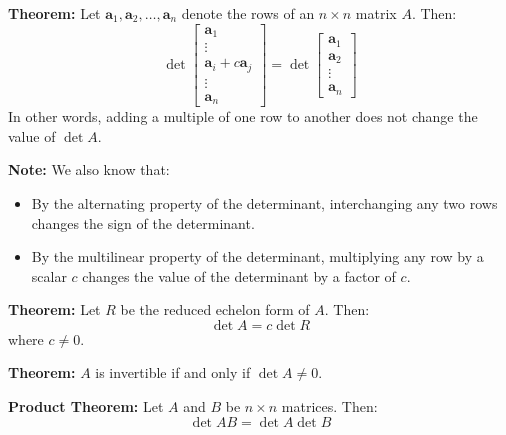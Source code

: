 \documentclass{article}
\newcommand{\bff}[1]{\mathbf{#1}}
\begin{document}
    \begin{minipage}[t]{0.45\linewidth}
        \textbf{Theorem:} Let $\bff{a}_1,\bff{a}_2,\dots,\bff{a}_n$ denote the rows of an $n\times n$ matrix $A$. Then:
        \begin{equation*}
            \det\begin{bmatrix}
                \bff{a}_1 \\ \vdots \\ \bff{a}_i + c\bff{a}_j \\ \vdots \\ \bff{a}_n
            \end{bmatrix} = \det \begin{bmatrix}
                \bff{a}_1 \\ \bff{a}_2 \\ \vdots \\ \bff{a}_n
            \end{bmatrix}
        \end{equation*}
        In other words, adding a multiple of one row to another does not change the value of $\det A$.
        \vspace{2mm}

        \textbf{Note:} We also know that:
        \begin{itemize}
            \item By the alternating property of the determinant, interchanging any two rows changes the sign of the determinant.
            \item By the multilinear property of the determinant, multiplying any row by a scalar $c$ changes the value of the determinant by a factor of $c$.
        \end{itemize}
        \vspace{2mm}

        \textbf{Theorem:} Let $R$ be the reduced echelon form of $A$. Then:
        \begin{equation*}
            \det A = c\det R
        \end{equation*}
        where $c\neq 0$.
        \vspace{2mm}

        \textbf{Theorem:} $A$ is invertible if and only if $\det A \neq 0$.
        \vspace{2mm}

        \textbf{Product Theorem:} Let $A$ and $B$ be $n\times n$ matrices. Then:
        \begin{equation*}
            \det AB = \det A \det B
        \end{equation*}
        \vspace{2mm}


\end{minipage}
\end{document}
